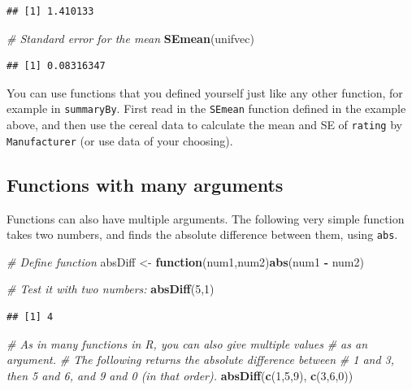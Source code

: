 \documentclass[]{book}
\newenvironment{Shaded}{\begin{snugshade}}{\end{snugshade}}
\newcommand{\CommentTok}[1]{\textcolor[rgb]{0.56,0.35,0.01}{\textit{#1}}}
\newcommand{\ControlFlowTok}[1]{\textcolor[rgb]{0.13,0.29,0.53}{\textbf{#1}}}
\newcommand{\DecValTok}[1]{\textcolor[rgb]{0.00,0.00,0.81}{#1}}
\newcommand{\KeywordTok}[1]{\textcolor[rgb]{0.13,0.29,0.53}{\textbf{#1}}}
\newcommand{\NormalTok}[1]{#1}
\newcommand{\OperatorTok}[1]{\textcolor[rgb]{0.81,0.36,0.00}{\textbf{#1}}}
\newcommand{\StringTok}[1]{\textcolor[rgb]{0.31,0.60,0.02}{#1}}
\let\BeginKnitrBlock\begin \let\EndKnitrBlock\end
\begin{document}
\begin{verbatim}
## [1] 1.410133
\end{verbatim}

\begin{Shaded}
\begin{Highlighting}[]
\CommentTok{# Standard error for the mean}
\KeywordTok{SEmean}\NormalTok{(unifvec)}
\end{Highlighting}
\end{Shaded}

\begin{verbatim}
## [1] 0.08316347
\end{verbatim}

\BeginKnitrBlock{rmdtry}
You can use functions that you defined yourself just like any other function, for example in \texttt{summaryBy}. First read in the \texttt{SEmean} function defined in the example above, and then use the cereal data to calculate the mean and SE of \texttt{rating} by \texttt{Manufacturer} (or use data of your choosing).
\EndKnitrBlock{rmdtry}

\hypertarget{functions-with-many-arguments}{%
\subsection{Functions with many arguments}\label{functions-with-many-arguments}}

Functions can also have multiple arguments. The following very simple function takes two numbers, and finds the absolute difference between them, using \texttt{abs}.

\begin{Shaded}
\begin{Highlighting}[]
\CommentTok{# Define function}
\NormalTok{absDiff <-}\StringTok{ }\ControlFlowTok{function}\NormalTok{(num1,num2)}\KeywordTok{abs}\NormalTok{(num1 }\OperatorTok{-}\StringTok{ }\NormalTok{num2)}

\CommentTok{# Test it with two numbers:}
\KeywordTok{absDiff}\NormalTok{(}\DecValTok{5}\NormalTok{,}\DecValTok{1}\NormalTok{)}
\end{Highlighting}
\end{Shaded}

\begin{verbatim}
## [1] 4
\end{verbatim}

\begin{Shaded}
\begin{Highlighting}[]
\CommentTok{# As in many functions in R, you can also give multiple values}
\CommentTok{# as an argument.}
\CommentTok{# The following returns the absolute difference between }
\CommentTok{# 1 and 3, then 5 and 6, and 9 and 0 (in that order).}
\KeywordTok{absDiff}\NormalTok{(}\KeywordTok{c}\NormalTok{(}\DecValTok{1}\NormalTok{,}\DecValTok{5}\NormalTok{,}\DecValTok{9}\NormalTok{), }\KeywordTok{c}\NormalTok{(}\DecValTok{3}\NormalTok{,}\DecValTok{6}\NormalTok{,}\DecValTok{0}\NormalTok{))}
\end{Highlighting}
\end{Shaded}
\end{document}
